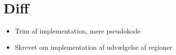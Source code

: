 {
\section*{Diff}
\begin{itemize}
    \item Trim af implementation, mere pseudokode
    \item Skrevet om implementation af udvælgelse af regioner
\end{itemize}
}

